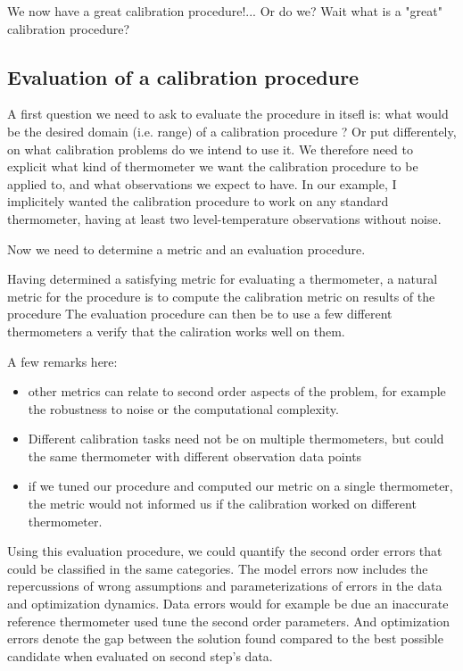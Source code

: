 \begin{bibunit}
We now have a great calibration procedure!... Or do we?  Wait what is a "great" calibration procedure?

\subsection{Evaluation of a calibration procedure}

A first question we need to ask to evaluate the procedure in itsefl is: what would be the desired domain (i.e. range) of a calibration procedure ? Or put differentely, on what calibration problems do we intend to use it.
We therefore need to explicit what kind of thermometer we want the calibration procedure to be applied to, and what observations we expect to have.
In our example, I implicitely wanted the calibration procedure to work on any standard thermometer, having at least two level-temperature observations without noise.

Now we need to determine a metric and an evaluation procedure.

Having determined a satisfying metric for evaluating a thermometer, a natural metric for the procedure is to compute the calibration metric on results of the procedure
The evaluation procedure can then be to use a few different thermometers a verify that the caliration works well on them.


A few remarks here:
\begin{itemize}
\item other metrics can relate to second order aspects of the problem, for example the robustness to noise or the computational complexity.
\item Different calibration tasks need not be on multiple thermometers, but could the same thermometer with different observation data points
\item if we tuned our procedure and computed our metric on a single thermometer, the metric would not informed us if the calibration worked on different thermometer.
\end{itemize}


Using this evaluation procedure, we could quantify the second order errors that could be classified in the same categories.
The model errors now includes the repercussions of wrong assumptions and parameterizations of errors in the data and optimization dynamics.
Data errors would for example be due an inaccurate reference thermometer used tune the second order parameters.
And optimization errors denote the gap between the solution found compared to the best possible candidate when evaluated on second step's data.



\end{bibunit}
